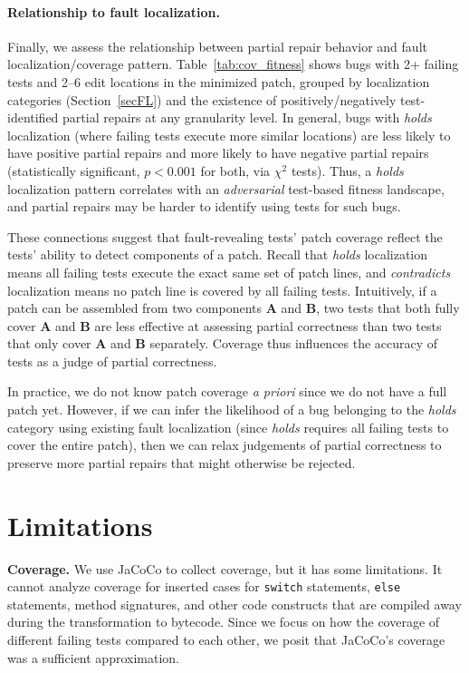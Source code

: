 \documentclass[10pt, conference]{IEEEtran}
\begin{document}
\paragraph{Relationship to fault localization.} 
Finally, we assess the relationship between partial repair behavior and fault
localization/coverage pattern. Table~\ref{tab:cov_fitness} shows 
bugs with 2+ failing tests 
and 2--6 edit locations in the minimized patch, grouped by localization
categories (Section~\ref{secFL})
and the existence of positively/negatively
test-identified partial repairs at any granularity level.
In general, bugs with \emph{holds} localization (where failing tests execute
more similar locations) are less likely to have
positive partial repairs and more likely to have negative partial repairs (statistically significant,
$p < 0.001$ for both, via $\chi^2$ tests).
Thus, a \emph{holds} localization pattern correlates with an
\emph{adversarial} test-based fitness landscape,
and partial repairs may be harder to identify using tests for such bugs. 

These connections 
suggest that fault-revealing tests' patch coverage reflect the tests' ability
to detect components of a patch.
Recall that \emph{holds} localization means all failing tests execute 
the exact same set of patch lines, and \emph{contradicts} localization 
means no patch line is covered by all failing tests.
Intuitively, if a patch can be
assembled from two components \textbf{A} and \textbf{B}, two tests that both
fully cover \textbf{A} and \textbf{B} are less effective at assessing partial
correctness than two tests that only cover \textbf{A} and \textbf{B} separately.
Coverage thus influences the accuracy of tests as a judge of partial correctness.

In practice, we do not know patch coverage \emph{a priori}  
since we do not have a full patch yet. However, if we can infer the
likelihood of a bug belonging to the \emph{holds} category using existing 
fault localization (since \emph{holds} requires all failing tests to cover the 
entire patch), then we can relax judgements of partial correctness to 
preserve more partial repairs that might otherwise be rejected.

\section{Limitations}
\label{sec:limits}

\noindent\textbf{Coverage.}
We use JaCoCo to collect coverage, but it has some
limitations. It cannot analyze coverage for inserted
cases for \texttt{switch} statements, \texttt{else} statements, method
signatures, and other code constructs that are compiled away during the
transformation to bytecode. Since we focus on how the coverage of different
failing tests compared to each other, we posit that JaCoCo's coverage was a
sufficient approximation.
\end{document}
